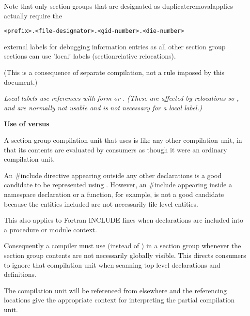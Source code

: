 Note that only section groups that are designated as
duplicate\dash removal\dash applies actually require the
\begin{alltt}
    <prefix>.<file-designator>.<gid-number>.<die-number>
\end{alltt}
external labels for debugging information entries as all other
section group sections can use 'local' labels 
(section\dash relative
relocations).

(This is a consequence of separate compilation, not a rule
imposed by this document.)

\textit{Local labels use references with form 
or 
. 
(These are affected by relocations
so 
, 
 and 
 are
normally not usable and 
 is not necessary
for a local label.)}

\textbf{Use of  versus 
}

A section group compilation unit that uses 
is like any other compilation unit, in that its contents
are evaluated by consumers as though it were an ordinary
compilation unit.

An \#include directive appearing outside any other
declarations is a good candidate to be represented using
. 
However, an \#include appearing inside
a  namespace declaration or a function, for example, is
not a good candidate because the entities included are not
necessarily file level entities.

This also applies to Fortran INCLUDE lines when declarations
are included into a procedure or module context.

Consequently a compiler must use  (instead
of ) in a section group whenever the section
group contents are not necessarily globally visible. This
directs consumers to ignore that compilation unit when scanning
top level declarations and definitions.

The  compilation unit will be referenced
from elsewhere and the referencing locations give the
appropriate context for interpreting the partial compilation
unit.


